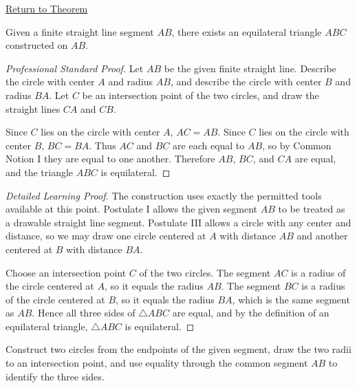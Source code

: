 \newpage
{}
\label{prf:euclid-i-1}

\begin{remark*}[Return]
\hyperref[thm:euclid-i-1]{Return to Theorem}
\end{remark*}

\begin{theorem*}
Given a finite straight line segment $AB$, there exists an equilateral
triangle $ABC$ constructed on $AB$.
\end{theorem*}

\begin{proof}[Professional Standard Proof]
\LRAProofBodyStart
Let $AB$ be the given finite straight line. Describe the circle with center
$A$ and radius $AB$, and describe the circle with center $B$ and radius $BA$.
Let $C$ be an intersection point of the two circles, and draw the straight
lines $CA$ and $CB$.

Since $C$ lies on the circle with center $A$, $AC=AB$. Since $C$ lies on the
circle with center $B$, $BC=BA$. Thus $AC$ and $BC$ are each equal to $AB$,
so by Common Notion I they are equal to one another. Therefore $AB$, $BC$,
and $CA$ are equal, and the triangle $ABC$ is equilateral.
\end{proof}

\begin{proof}[Detailed Learning Proof]
\LRAProofBodyStart


The construction uses exactly the permitted tools available at this point.
Postulate I allows the given segment $AB$ to be treated as a drawable straight
line segment. Postulate III allows a circle with any center and distance, so we
may draw one circle centered at $A$ with distance $AB$ and another centered at
$B$ with distance $BA$.

Choose an intersection point $C$ of the two circles. The segment $AC$ is a
radius of the circle centered at $A$, so it equals the radius $AB$. The segment
$BC$ is a radius of the circle centered at $B$, so it equals the radius $BA$,
which is the same segment as $AB$. Hence all three sides of $\triangle ABC$
are equal, and by the definition of an equilateral triangle, $\triangle ABC$ is
equilateral.
\end{proof}

\begin{remark*}
Construct two circles from the endpoints of the given segment, draw the two
radii to an intersection point, and use equality through the common segment
$AB$ to identify the three sides.
\end{remark*}

